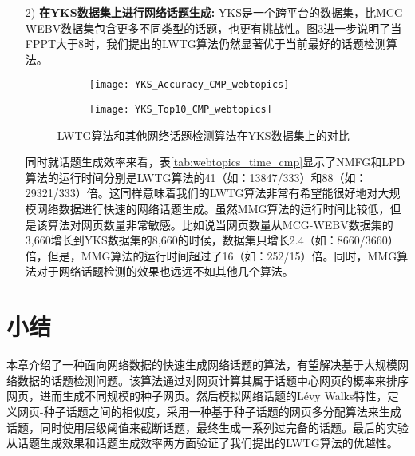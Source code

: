 \begin{enumerate}
  \item[2)] \textbf{在YKS数据集上进行网络话题生成:} YKS是一个跨平台的数据集，比MCG-WEBV数据集包含更多不同类型的话题，也更有挑战性。图\ref{fig:YKS_CMP_webtopics}进一步说明了当FPPT大于8时，我们提出的LWTG算法仍然显著优于当前最好的话题检测算法。

  \begin{figure}[!htbp]
    \centering
    \begin{subfigure}[b]{0.5\textwidth}
      \texttt{[image: YKS\_Accuracy\_CMP\_webtopics]}
      \caption{}
      \label{fig:YKS_Accuracy_CMP_webtopics}
    \end{subfigure}%
    \begin{subfigure}[b]{0.5\textwidth}
      \texttt{[image: YKS\_Top10\_CMP\_webtopics]}
      \caption{}
      \label{fig:YKS_Top10_CMP_webtopics}
    \end{subfigure}
    \caption{LWTG算法和其他网络话题检测算法在YKS数据集上的对比}
    \label{fig:YKS_CMP_webtopics}
  \end{figure}
  同时就话题生成效率来看，表\ref{tab:webtopics_time_cmp}显示了NMFG和LPD算法的运行时间分别是LWTG算法的41（如：13847/333）和88（如：29321/333）倍。这同样意味着我们的LWTG算法非常有希望能很好地对大规模网络数据进行快速的网络话题生成。虽然MMG算法的运行时间比较低，但是该算法对网页数量非常敏感。比如说当网页数量从MCG-WEBV数据集的3,660增长到YKS数据集的8,660的时候，数据集只增长2.4（如：8660/3660）倍，但是，MMG算法的运行时间超过了16（如：252/15）倍。同时，MMG算法对于网络话题检测的效果也远远不如其他几个算法。
\end{enumerate}


\section{小结}

本章介绍了一种面向网络数据的快速生成网络话题的算法，有望解决基于大规模网络数据的话题检测问题。该算法通过对网页计算其属于话题中心网页的概率来排序网页，进而生成不同规模的种子网页。然后模拟网络话题的L\'evy Walks特性，定义网页-种子话题之间的相似度，采用一种基于种子话题的网页多分配算法来生成话题，同时使用层级阈值来截断话题，最终生成一系列过完备的话题。最后的实验从话题生成效果和话题生成效率两方面验证了我们提出的LWTG算法的优越性。


